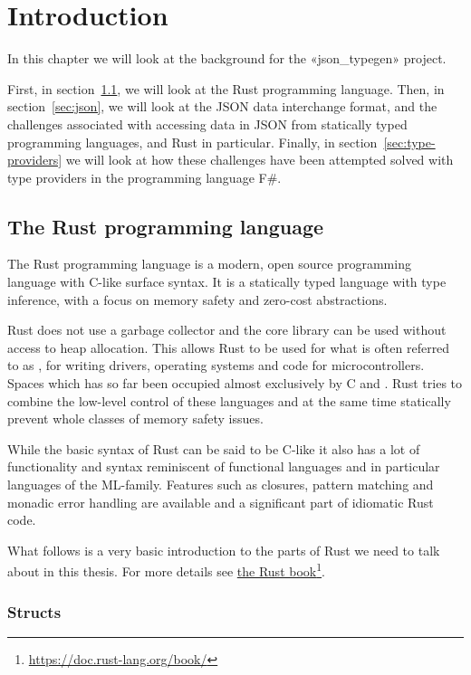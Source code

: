 
\chapter{Introduction}

In this chapter we will look at the background for the «json_typegen» project.

First, in section~\ref{sec:rust-intro}, we will look at the Rust programming language. Then, in section~\ref{sec:json}, we will look at the JSON data interchange format, and the challenges associated with accessing data in JSON from statically typed programming languages, and Rust in particular. Finally, in section~\ref{sec:type-providers} we will look at how these challenges have been attempted solved with type providers in the programming language F\#.

\section{The Rust programming language}
\label{sec:rust-intro}

The Rust programming language is a modern, open source programming language with C-like surface syntax. It is a statically typed language with type inference, with a focus on memory safety and zero-cost abstractions.

Rust does not use a garbage collector and the core library can be used without access to heap allocation. This allows Rust to be used for what is often referred to as , for writing drivers, operating systems and code for microcontrollers. Spaces which has so far been occupied almost exclusively by C and \cpp. Rust tries to combine the low-level control of these languages and at the same time statically prevent whole classes of memory safety issues\cite{the-rust-language}.

While the basic syntax of Rust can be said to be C-like it also has a lot of functionality and syntax reminiscent of functional languages and in particular languages of the ML-family. Features such as closures, pattern matching and monadic error handling are available and a significant part of idiomatic Rust code.

What follows is a very basic introduction to the parts of Rust we need to talk about in this thesis. For more details see \href{https://doc.rust-lang.org/book/}{the Rust book}\footnote{\url{https://doc.rust-lang.org/book/}}.

\subsection{Structs}


